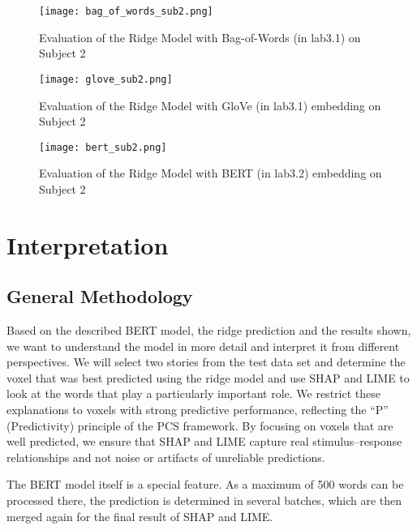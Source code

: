 \documentclass[12pt,letterpaper]{article}
\begin{document}
\begin{figure}[H]
  \centering
  \texttt{[image: bag\_of\_words\_sub2.png]}
  \caption{Evaluation of the Ridge Model with Bag-of-Words (in lab3.1) on Subject 2}
  \label{fig:evaluation_ridge_bert_pretrained_subject2}
\end{figure}

\begin{figure}[H]
  \centering
  \texttt{[image: glove\_sub2.png]}
  \caption{Evaluation of the Ridge Model with GloVe (in lab3.1) embedding on Subject 2}
  \label{fig:evaluation_ridge_bert_pretrained_subject2}
\end{figure}

\begin{figure}[H]
  \centering
  \texttt{[image: bert\_sub2.png]}
  \caption{Evaluation of the Ridge Model with BERT (in lab3.2) embedding on Subject 2}
  \label{fig:evaluation_ridge_bert_pretrained_subject2}
\end{figure}

\section{Interpretation}

\subsection{General Methodology}
Based on the described BERT model, the ridge prediction and the results shown, we want to understand the model in more detail and interpret it from different perspectives. We will select two stories from the test data set and determine the voxel that was best predicted using the ridge model and use SHAP and LIME to look at the words that play a particularly important role. We restrict these explanations to voxels with strong predictive performance, reflecting the “P” (Predictivity) principle of the PCS framework. By focusing on voxels that are well predicted, we ensure that SHAP and LIME capture real stimulus–response relationships and not noise or artifacts of unreliable predictions.

The BERT model itself is a special feature. As a maximum of 500 words can be processed there, the prediction is determined in several batches, which are then merged again for the final result of SHAP and LIME.
\end{document}
